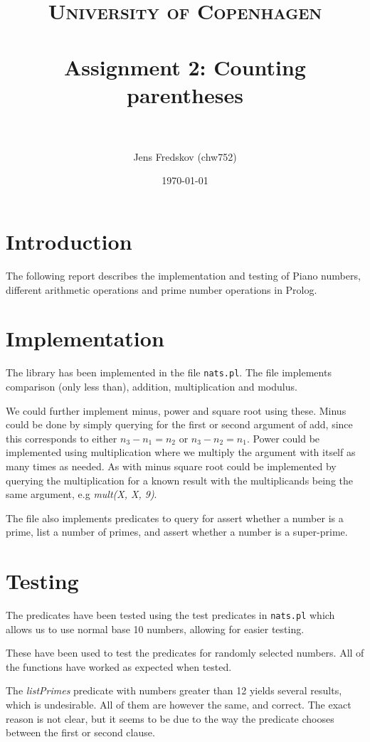 \documentclass[a4paper, 11pt]{article}
\title{ 
\normalfont\normalsize 
\textsc{University of Copenhagen} \\ [25pt] %
\horrule{0.5pt} \\[0.4cm] %
\huge Assignment 2: Counting parentheses \\ %
\horrule{2pt} \\[0.5cm] %
}
\author{Jens Fredskov (chw752)} %
\date{\normalsize\today} %
\begin{document}
\maketitle

\section{Introduction} %
\label{sec:introduction}

The following report describes the implementation and testing of Piano numbers, different arithmetic operations and prime number operations in Prolog.


\section{Implementation} %
\label{sec:implementation}

The library has been implemented in the file \texttt{nats.pl}. The file implements comparison (only less than), addition, multiplication and modulus.

We could further implement minus, power and square root using these. Minus could be done by simply querying for the first or second argument of add, since this corresponds to either $ n_3 - n_1 = n_2 $ or $ n_3 - n_2 = n_1 $. Power could be implemented using multiplication where we multiply the argument with itself as many times as needed. As with minus square root could be implemented by querying the multiplication for a known result with the multiplicands being the same argument, e.g \emph{mult(X, X, 9)}.

The file also implements predicates to query for assert whether a number is a prime, list a number of primes, and assert whether a number is a super-prime.

\section{Testing} %
\label{sec:testing}

The predicates have been tested using the test predicates in \texttt{nats.pl} which allows us to use normal base 10 numbers, allowing for easier testing.

These have been used to test the predicates for randomly selected numbers. All of the functions have worked as expected when tested.

The \emph{listPrimes} predicate with numbers greater than 12 yields several results, which is undesirable. All of them are however the same, and correct. The exact reason is not clear, but it seems to be due to the way the predicate chooses between the first or second clause.
\end{document}
